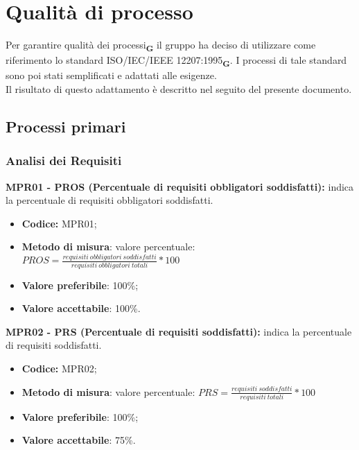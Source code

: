 \section{Qualità di processo}
Per garantire qualità dei processi\textsubscript{\textbf{G}} il gruppo ha deciso di utilizzare come riferimento lo standard ISO/IEC/IEEE 12207:1995\textsubscript{\textbf{G}}. 
I processi di tale standard sono poi stati semplificati e adattati alle esigenze.\\Il risultato di questo adattamento è descritto nel seguito del presente documento.
\subsection{Processi primari}
\subsubsection{Analisi dei Requisiti}
\textbf{MPR01 - PROS (Percentuale di requisiti obbligatori soddisfatti):} indica la percentuale di requisiti obbligatori soddisfatti.
\begin{itemize}
    \item \textbf{Codice:} MPR01;
    \item \textbf{Metodo di misura}: valore percentuale: $PROS = \frac{requisiti \ obbligatori \ soddisfatti}{requisiti \ obbligatori \ totali} * 100$
    \item \textbf{Valore preferibile}: 100\%;
    \item \textbf{Valore accettabile}: 100\%.
\end{itemize}
\textbf{MPR02 - PRS (Percentuale di requisiti soddisfatti):} indica la percentuale di requisiti soddisfatti.
\begin{itemize}
    \item \textbf{Codice:} MPR02;
    \item \textbf{Metodo di misura}: valore percentuale: $PRS = \frac{requisiti \ soddisfatti}{requisiti \ totali} * 100$
    \item \textbf{Valore preferibile}: 100\%;
    \item \textbf{Valore accettabile}: 75\%.
\end{itemize}
